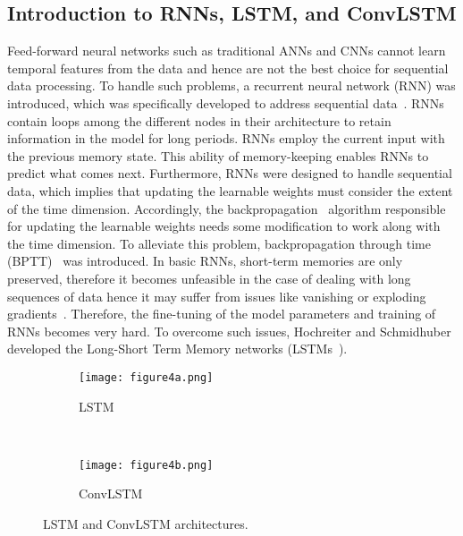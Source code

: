 \subsection{Introduction to RNNs, LSTM, and ConvLSTM}
Feed-forward neural networks such as traditional ANNs and CNNs cannot learn temporal features from the data and hence are not the best choice for sequential data processing.
To handle such problems, a recurrent neural network (RNN) was introduced, which was specifically developed to address sequential data~\cite{aggarwal2018neural, Lecun2015, goodfellow2016deep}. 
RNNs contain loops among the different nodes in their architecture to retain information in the model for long periods.
RNNs employ the current input with the previous memory state.
This ability of memory-keeping enables RNNs to predict what comes next. 
Furthermore, RNNs were designed to handle sequential data, which implies that updating the learnable weights must consider the extent of the time dimension. 
Accordingly, the backpropagation~\cite{Rumelhart1986} algorithm responsible for updating the learnable weights needs some modification to work along with the time dimension.
To alleviate this problem, backpropagation through time (BPTT)~\cite{aggarwal2018neural, goodfellow2016deep} was introduced. 
In basic RNNs, short-term memories are only preserved, therefore it becomes unfeasible in the case of dealing with long sequences of data hence it may suffer from issues like vanishing or exploding gradients~\cite{bengio1994learning}.
Therefore, the fine-tuning of the model parameters and training of RNNs becomes very hard.
To overcome such issues, Hochreiter and Schmidhuber developed the Long-Short Term Memory networks (LSTMs~\cite{Hochreiter1997}).
\begin{figure} [!h]
	\centering
	\begin{subfigure}[b]{1\textwidth}
		\centering
		\texttt{[image: figure4a.png]}
		\caption{LSTM}
		\label{fig:LSTM}
	\end{subfigure}
	\\ 
	\hfill
	\begin{subfigure}[b]{1\textwidth}
		\centering
		\texttt{[image: figure4b.png]}
		\caption{ConvLSTM}
		\label{fig:ConvLSTM}	
	\end{subfigure}
	\caption{LSTM and ConvLSTM architectures.}
	\label{fig:lstm_convlstm}
\end{figure}

